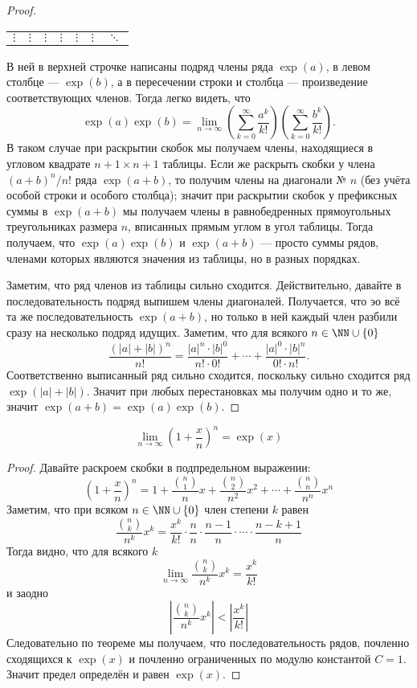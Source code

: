 \documentclass[12pt,a4paper]{article}
\begin{document}
\begin{proof}
\begin{table}[h]
\begin{tabular}{c||c|c|c|c|c|c}
                \hline
                $\vdots$ & $\vdots$ & $\vdots$ & $\vdots$ & $\vdots$ & $\vdots$ & $\ddots$\\
            \end{tabular}
        \end{table}
        В ней в верхней строчке написаны подряд члены ряда $\exp(a)$, в левом столбце --- $\exp(b)$, а в пересечении строки и столбца --- произведение соответствующих членов. Тогда легко видеть, что
        \[\exp(a)\exp(b) = \lim_{n \to \infty} \left(\sum_{k=0}^\infty \frac{a^k}{k!}\right)\left(\sum_{k=0}^\infty \frac{b^k}{k!}\right).\]
        В таком случае при раскрытии скобок мы получаем члены, находящиеся в угловом квадрате $n+1 \times n+1$ таблицы. Если же раскрыть скобки у члена $(a+b)^n/n!$ ряда $\exp(a+b)$, то получим члены на диагонали № $n$ (без учёта особой строки и особого столбца); значит при раскрытии скобок у префиксных суммы в $\exp(a+b)$ мы получаем члены в равнобедренных прямоугольных треугольниках размера $n$, вписанных прямым углом в угол таблицы. Тогда получаем, что $\exp(a)\exp(b)$ и $\exp(a+b)$ --- просто суммы рядов, членами которых являются значения из таблицы, но в разных порядках.

        Заметим, что ряд членов из таблицы сильно сходится. Действительно, давайте в последовательность подряд выпишем члены диагоналей. Получается, что эо всё та же последовательность $\exp(a+b)$, но только в ней каждый член разбили сразу на несколько подряд идущих. Заметим, что для всякого $n \in \NN \cup \{0\}$
        \[\frac{(|a|+|b|)^n}{n!} = \frac{|a|^n \cdot |b|^0}{n! \cdot 0!} + \cdots + \frac{|a|^0 \cdot |b|^n}{0! \cdot n!}.\]
        Соответственно выписанный ряд сильно сходится, поскольку сильно сходится ряд $\exp(|a| + |b|)$. Значит при любых перестановках мы получим одно и то же, значит $\exp(a + b) = \exp(a) \exp(b)$.
    \end{proof}

    \begin{statement}
        \[\lim_{n \to \infty} \left(1 + \frac{x}{n}\right)^n = \exp(x)\]
    \end{statement}

    \begin{proof}
        Давайте раскроем скобки в подпредельном выражении:
        \[
            \left(1 + \frac{x}{n}\right)^n
            = 1 + \frac{\binom{n}{1}}{n}x + \frac{\binom{n}{2}}{n^2}x^2 + \cdots + \frac{\binom{n}{n}}{n^n}x^n
        \]
        Заметим, что при всяком $n \in \NN \cup \{0\}$ член степени $k$ равен
        \[\frac{\binom{n}{k}}{n^k}x^k = \frac{x^k}{k!} \cdot \frac{n}{n} \cdot \frac{n-1}{n} \cdot \cdots \cdot \frac{n-k+1}{n}\]
        Тогда видно, что для всякого $k$
        \[\lim_{n \to \infty} \frac{\binom{n}{k}}{n^k}x^k = \frac{x^k}{k!}\]
        и заодно
        \[\left|\frac{\binom{n}{k}}{n^k}x^k\right| < \left|\frac{x^k}{k!}\right|\]
        Следовательно по теореме мы получаем, что последовательность рядов, почленно сходящихся к $\exp(x)$ и почленно ограниченных по модулю константой $C=1$. Значит предел определён и равен $\exp(x)$.
    \end{proof}
\end{document}

